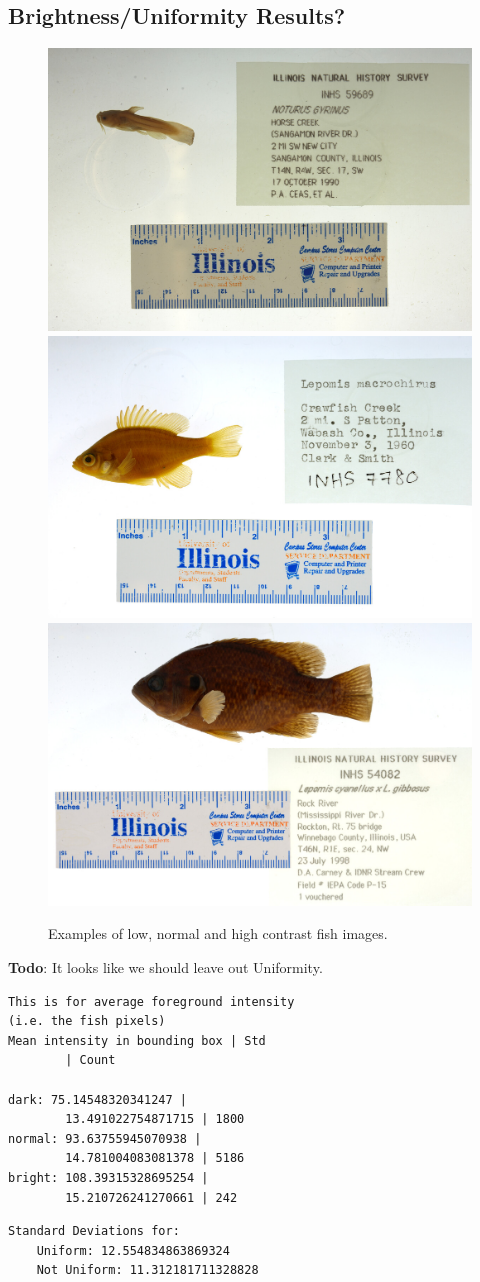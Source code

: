 \documentclass[conference]{IEEEtran}
\begin{document}
\subsection{Brightness/Uniformity Results?}
\begin{figure}[H]
  \centering
  \includegraphics[width=0.49\linewidth]{images/dark}
  \includegraphics[width=0.49\linewidth]{images/normal}
  \includegraphics[width=0.49\linewidth]{images/bright}
  \caption{Examples of low, normal and high contrast fish images.}
\end{figure}
\textbf{Todo}: It looks like we should leave out Uniformity.

\begin{verbatim}
This is for average foreground intensity
(i.e. the fish pixels)
Mean intensity in bounding box | Std
        | Count

dark: 75.14548320341247 |
        13.491022754871715 | 1800
normal: 93.63755945070938 |
        14.781004083081378 | 5186
bright: 108.39315328695254 |
        15.210726241270661 | 242
\end{verbatim}
\begin{verbatim}
Standard Deviations for:
    Uniform: 12.554834863869324
    Not Uniform: 11.312181711328828
\end{verbatim}
\end{document}
